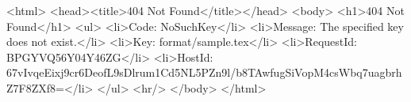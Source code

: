 <html>
<head><title>404 Not Found</title></head>
<body>
<h1>404 Not Found</h1>
<ul>
<li>Code: NoSuchKey</li>
<li>Message: The specified key does not exist.</li>
<li>Key: format/sample.tex</li>
<li>RequestId: BPGYVQ56Y04Y46ZG</li>
<li>HostId: 67vIvqeEixj9cr6DeofL9sDlrum1Cd5NL5PZn9l/b8TAwfugSiVopM4csWbq7uagbrhZ7F8ZXf8=</li>
</ul>
<hr/>
</body>
</html>
